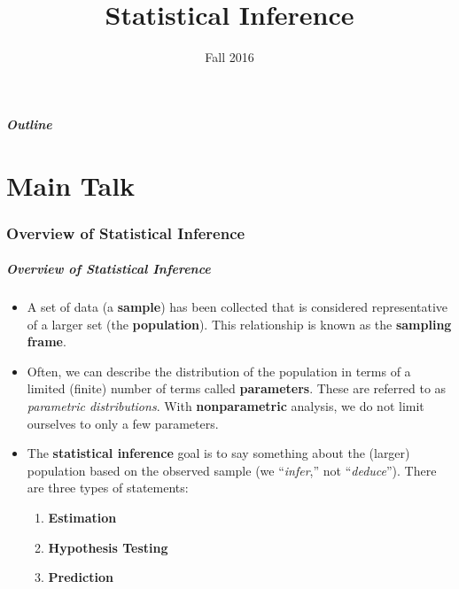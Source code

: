 \documentclass{beamer}
\title[Inference]{Statistical Inference}
\date[Fall 2016]{Fall 2016}
\begin{document}
\frame{\titlepage}

\begin{frame}
  \frametitle{Outline}
     \tableofcontents[part=1]
\end{frame}

\part<presentation>{Main Talk}


\section{Overview of Statistical Inference}

\begin{frame}[shrink=2]
\frametitle{Overview of Statistical Inference}
\begin{itemize}
\item A set of data (a \textbf{sample}) has been collected that is considered representative of a larger set (the \textbf{population}). This relationship is known as the \textbf{sampling frame}.
\item Often, we can describe the distribution of the population in terms of a limited (finite) number of terms called \textbf{parameters}. These are referred to as \textit{parametric distributions}. With \textbf{nonparametric} analysis, we do not limit ourselves to only a few parameters.
\item The \textbf{statistical inference} goal is to say something about the (larger) population based on the observed sample (we ``\emph{infer},'' not ``\emph{deduce}''). There are three types of statements:
 \begin{enumerate}
\item \textbf{Estimation}
\item \textbf{Hypothesis Testing}
\item \textbf{Prediction}
\end{enumerate}
\end{itemize}
\end{frame}
\end{document}
